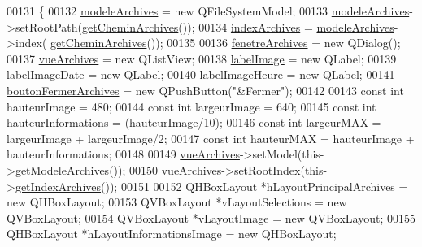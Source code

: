 \begin{DoxyCode}
00131 \{
00132     \hyperlink{class_archives_a61376e4ec330aea053fede230a1bc786}{modeleArchives} = \textcolor{keyword}{new} QFileSystemModel;
00133     \hyperlink{class_archives_a61376e4ec330aea053fede230a1bc786}{modeleArchives}->setRootPath(\hyperlink{class_archives_a65dfbaba0123e6530b03bfb70e614c90}{getCheminArchives}());
00134     \hyperlink{class_archives_a31cba52f3979585ee5e2b9390d21322b}{indexArchives} = \hyperlink{class_archives_a61376e4ec330aea053fede230a1bc786}{modeleArchives}->index(
      \hyperlink{class_archives_a65dfbaba0123e6530b03bfb70e614c90}{getCheminArchives}());
00135 
00136     \hyperlink{class_archives_ad7c8209637b01f638b64530020d18b8e}{fenetreArchives} = \textcolor{keyword}{new} QDialog();
00137     \hyperlink{class_archives_a28fe566dcac396079d064460b17293b9}{vueArchives} = \textcolor{keyword}{new} QListView;
00138     \hyperlink{class_archives_af311679d957985d956a4ee5ad28a5988}{labelImage} = \textcolor{keyword}{new} QLabel;
00139     \hyperlink{class_archives_accb81477f1edca94691ae630ddc1f3f9}{labelImageDate} = \textcolor{keyword}{new} QLabel;
00140     \hyperlink{class_archives_ab678af24ff4c67b8791ab52e998c79cb}{labelImageHeure} = \textcolor{keyword}{new} QLabel;
00141     \hyperlink{class_archives_a598e607e203aee9386f85d55f20d8fda}{boutonFermerArchives} = \textcolor{keyword}{new} QPushButton(\textcolor{stringliteral}{"&Fermer"});
00142 
00143     \textcolor{keyword}{const} \textcolor{keywordtype}{int} hauteurImage = 480;
00144     \textcolor{keyword}{const} \textcolor{keywordtype}{int} largeurImage = 640;
00145     \textcolor{keyword}{const} \textcolor{keywordtype}{int} hauteurInformations = (hauteurImage/10);
00146     \textcolor{keyword}{const} \textcolor{keywordtype}{int} largeurMAX = largeurImage + largeurImage/2;
00147     \textcolor{keyword}{const} \textcolor{keywordtype}{int} hauteurMAX = hauteurImage + hauteurInformations;
00148 
00149     \hyperlink{class_archives_a28fe566dcac396079d064460b17293b9}{vueArchives}->setModel(this->\hyperlink{class_archives_ab5a55ac2e810cfdec3ce19af14087ceb}{getModeleArchives}());
00150     \hyperlink{class_archives_a28fe566dcac396079d064460b17293b9}{vueArchives}->setRootIndex(this->\hyperlink{class_archives_a3df83e6dd301afe331d7e75bd1b84a57}{getIndexArchives}());
00151 
00152     QHBoxLayout *hLayoutPrincipalArchives = \textcolor{keyword}{new} QHBoxLayout;
00153     QVBoxLayout *vLayoutSelections = \textcolor{keyword}{new} QVBoxLayout;
00154     QVBoxLayout *vLayoutImage = \textcolor{keyword}{new} QVBoxLayout;
00155     QHBoxLayout *hLayoutInformationsImage = \textcolor{keyword}{new} QHBoxLayout;

\end{DoxyCode}
